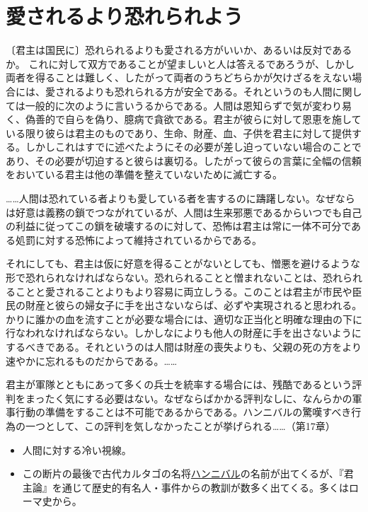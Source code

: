 \documentclass[autodetect-engine,dvipdfmx-if-dvi,ja=standard]{bxjsarticle} \usepackage{mystyle}
\begin{document}
\section{愛されるより恐れられよう}



\begin{oframed}
  〔君主は国民に〕恐れられるよりも愛される方がいいか、あるいは反対であるか。
  これに対して双方であることが望ましいと人は答えるであろうが、しかし両者を得ることは難しく、したがって両者のうちどちらかが欠けざるをえない場合には、愛されるよりも恐れられる方が安全である。それというのも人間に関しては一般的に次のように言いうるからである。人間は恩知らずで気が変わり易く、偽善的で自らを偽り、臆病で貪欲である。君主が彼らに対して恩恵を施している限り彼らは君主のものであり、生命、財産、血、子供を君主に対して提供する。しかしこれはすでに述べたようにその必要が差し迫っていない場合のことであり、その必要が切迫すると彼らは裏切る。したがって彼らの言葉に全幅の信頼をおいている君主は他の準備を整えていないために滅亡する。

  ……人間は恐れている者よりも愛している者を害するのに躊躇しない。なぜならは好意は義務の鎖でつながれているが、人間は生来邪悪であるからいつでも自己の利益に従ってこの鎖を破壊するのに対して、恐怖は君主は常に一体不可分である処罰に対する恐怖によって維持されているからである。

  それにしても、君主は仮に好意を得ることがないとしても、憎悪を避けるような形で恐れられなければならない。恐れられることと憎まれないことは、恐れられることと愛されることよりもより容易に両立しうる。このことは君主が市民や臣民の財産と彼らの婦女子に手を出さないならば、必ずや実現されると思われる。かりに誰かの血を流すことが必要な場合には、適切な正当化と明確な理由の下に行なわれなければならない。しかしなによりも他人の財産に手を出さないようにするべきである。それというのは人間は財産の喪失よりも、父親の死の方をより速やかに忘れるものだからである。……

  君主が軍隊とともにあって多くの兵士を統率する場合には、残酷であるという評判をまったく気にする必要はない。なぜならばかかる評判なしに、なんらかの軍事行動の準備をすることは不可能であるからである。{ハンニバル}の驚嘆すべき行為の一つとして、この評判を気しなかったことが挙げられる……（第17章）
  
\end{oframed}

\begin{itemize}
\item 人間に対する冷い視線。

\item この断片の最後で古代カルタゴの名将\href{http://bit.ly/2W0IyBh}{ハンニバル}の名前が出てくるが、『君主論』を通じて歴史的有名人・事件からの教訓が数多く出てくる。多くはローマ史から。
\end{itemize}
\end{document}
